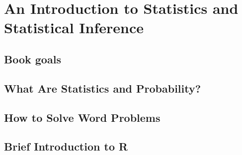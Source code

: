 \chapter{An Introduction to Statistics and Statistical Inference}  %

\section{Book goals}  %

\section{What Are Statistics and Probability?}  %

\section{How to Solve Word Problems}  %

\section{Brief Introduction to R}  %
